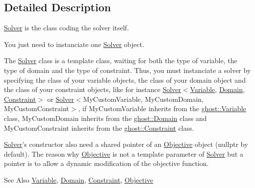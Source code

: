 \subsection{Detailed Description}
\hyperlink{classghost_1_1Solver}{Solver} is the class coding the solver itself. 

You just need to instanciate one \hyperlink{classghost_1_1Solver}{Solver} object.

The \hyperlink{classghost_1_1Solver}{Solver} class is a template class, waiting for both the type of variable, the type of domain and the type of constraint. Thus, you must instanciate a solver by specifying the class of your variable objects, the class of your domain object and the class of your constraint objects, like for instance \hyperlink{classghost_1_1Solver}{Solver}$<$\hyperlink{classghost_1_1Variable}{Variable}, \hyperlink{classghost_1_1Domain}{Domain}, \hyperlink{classghost_1_1Constraint}{Constraint}$>$ or \hyperlink{classghost_1_1Solver}{Solver}$<$My\-Custom\-Variable, My\-Custom\-Domain, My\-Custom\-Constraint$>$, if My\-Custom\-Variable inherits from the \hyperlink{classghost_1_1Variable}{ghost\-::\-Variable} class, My\-Custom\-Domain inherits from the \hyperlink{classghost_1_1Domain}{ghost\-::\-Domain} class and My\-Custom\-Constraint inherits from the \hyperlink{classghost_1_1Constraint}{ghost\-::\-Constraint} class.

\hyperlink{classghost_1_1Solver}{Solver}'s constructor also need a shared pointer of an \hyperlink{classghost_1_1Objective}{Objective} object (nullptr by default). The reason why \hyperlink{classghost_1_1Objective}{Objective} is not a template parameter of \hyperlink{classghost_1_1Solver}{Solver} but a pointer is to allow a dynamic modification of the objective function.

\begin{DoxySeeAlso}{See Also}
\hyperlink{classghost_1_1Variable}{Variable}, \hyperlink{classghost_1_1Domain}{Domain}, \hyperlink{classghost_1_1Constraint}{Constraint}, \hyperlink{classghost_1_1Objective}{Objective} 
\end{DoxySeeAlso}



